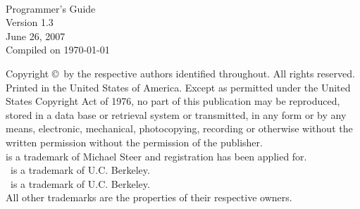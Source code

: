 \pagestyle{headings}

\vspace*{1in}
\begin{center}
    {\FREEDA}\\[0.5in]
    {\Large Programmer's Guide}\\[0.5in]
    {\Large Version 1.3}\\  %
      \vspace{0.5in}
    {\Large June 26, 2007}\\[0.5in]
    Compiled on \today
      \vspace{0.5in}
\end{center}
\newpage

\noindent Copyright \copyright\ by the respective authors
identified throughout. \vfill \noindent All rights reserved.
Printed in the United States of America. Except as permitted under
the United States Copyright Act of 1976, no part of this
publication may be reproduced, stored in a data base or retrieval
system or transmitted, in any form or by any means, electronic,
mechanical, photocopying, recording or otherwise without the
written permission without the permission of
the publisher.\\
\vfill
\noindent\FDA is a trademark of Michael Steer and registration has
been applied for.\\
\noindent\spicetwo\ is a trademark of U.C. Berkeley.\\
\spicethree\ is a trademark of U.C. Berkeley.\\
 All other trademarks are
the properties of their respective owners.
\vfill

